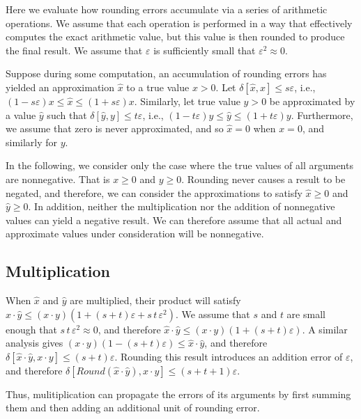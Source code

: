 \documentclass[letterpaper,USenglish,cleveref, autoref, thm-restate]{lipics-v2021}
\newcommand{\approximate}[1]{\hat{#1}}
\newcommand{\approxx}{\approximate{x}}
\newcommand{\approxy}{\approximate{y}}
\newcommand{\round}{\mathit{Round}}
\newcommand{\aerror}{\delta}
\newcommand{\roundepsilon}{\varepsilon}
\begin{document}
Here we evaluate how rounding errors accumulate via a series of arithmetic operations.  We assume that each operation is performed in a way that effectively computes the exact
arithmetic value, but this value is then rounded to produce the final result.  We assume that $\roundepsilon$ is sufficiently small that $\roundepsilon^2 \approx 0$.

Suppose during some computation, an accumulation of rounding errors has yielded an approximation $\approxx$ to a true value $x > 0$.
Let $\aerror[\approxx, x] \leq s \roundepsilon$, i.e., $(1-s\roundepsilon) x \leq \approxx \leq (1+s\roundepsilon) x$.  Similarly, let true value $y > 0$ be
approximated by a value $\approxy$ such that 
$\aerror[\approxy, y] \leq t \roundepsilon$, i.e., $(1-t\roundepsilon) y \leq \approxy \leq (1+t\roundepsilon) y$.
Furthermore, we assume that zero is never approximated, and so $\approxx = 0$ when $x = 0$, and similarly for $y$.

In the following, we consider only the case where the true values of
all arguments are nonnegative.  That is $x \geq 0$ and $y \geq 0$.
Rounding never causes a result to be negated, and therefore, we can
consider the approximations to satisfy $\approxx \geq 0$ and $\approxy
\geq 0$.  In addition, neither the multiplication nor the addition of
nonnegative values can yield a negative result.  We can therefore
assume that all actual and approximate values under consideration will
be nonnegative.

\subsection{Multiplication}

When $\approxx$ and $\approxy$ are multiplied, their product will satisfy
$\approxx \cdot \approxy \leq (x\cdot y) (1 + (s+t)\roundepsilon + s\,t\,\roundepsilon^2)$.
We assume that $s$ and $t$ are small enough that $s\, t\,\roundepsilon^2 \approx 0$, and therefore
$\approxx \cdot \approxy \leq (x\cdot y) (1 + (s+t)\roundepsilon)$.  A similar analysis gives
$(x\cdot y) (1 - (s+t)\roundepsilon) \leq \approxx \cdot \approxy$, and therefore
$\aerror[\approxx \cdot \approxy, x \cdot y] \leq (s+t)\roundepsilon$.
Rounding this result introduces an addition error of $\roundepsilon$, and therefore
$\aerror[\round(\approxx \cdot \approxy), x \cdot y] \leq (s+t+1)\roundepsilon$.

Thus, mulitiplication can propagate the errors of its arguments by first summing them and then adding an additional unit of rounding error.
\end{document}
